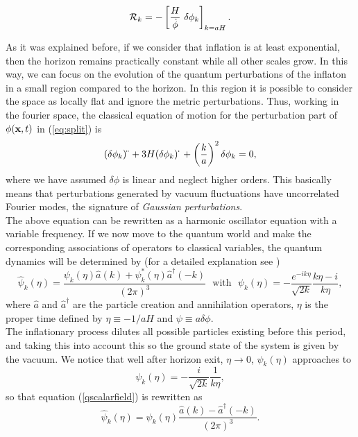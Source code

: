 \documentclass{rmaa}
\def\beq{\begin{equation}}
\def\eeq{\end{equation}}
\def\cal{\mathcal}
\begin{document}
\beq\label{eq:Pk1}
\mathcal{R}_k=-\left[ {H \over \dot \phi}\,\, \delta \phi_k \right]_{k=aH}.
\eeq
%

 
 \noindent
 As it was explained before, if we consider that inflation is at least exponential, 
 then the horizon remains practically constant while all other scales grow. In this way, 
 we can focus on the evolution of the quantum perturbations of the inflaton in a small 
 region compared to the horizon. In this region it is possible to consider the space as 
 locally flat and ignore the metric perturbations. Thus, working in the fourier space, the 
 classical equation of motion for the perturbation part of $\phi({\bf x},t)$ in (\ref{eq:split}) is
\beq
(\delta \phi_k)\ddot \,\,+3 H (\delta \phi_k)\dot \,\,+\left({k \over a}\right)^2 \delta \phi_k=0,
\eeq
%
where we have assumed $\delta \phi$ is linear and neglect higher orders. This basically means that perturbations generated by
vacuum fluctuations have uncorrelated Fourier modes, the signature of \textit{Gaussian perturbations}. 
\\

The above equation can be rewritten as a harmonic oscillator equation 
with a variable frequency. If we now move to the quantum world and make the corresponding 
associations of operators to classical variables, the quantum dynamics will be determined 
by (for a detailed explanation see \citep{LiddleLyth2})
\begin{equation}\label{qscalarfield}
\hat{\psi}_k\left(\eta\right)=\frac{\psi_k\left(\eta\right)\hat{a}\left(k\right)+\psi^*_k\left(\eta\right)\hat{a}^\dagger\left(-k\right)}{\left(2\pi\right)^3} \ \ \ \text{with} \ \ \ \psi_k\left(\eta\right)=-\frac{e^{-ik\eta}}{\sqrt{2k}}\frac{k\eta-i}{k\eta},
\end{equation}
where $\hat{a}$ and $\hat{a}^\dagger$ are the particle creation and annihilation 
operators, $\eta$ is the proper time defined by $\eta\equiv -1/aH$ and $\psi\equiv a\delta\phi$.
\\

The inflationary process dilutes all possible particles existing before this period, and
taking this into account this so the ground state of the system is given by the vacuum. 
We notice that well after horizon exit, $\eta \rightarrow 0$, $\psi_k\left(\eta\right)$ approaches to
\begin{equation}
\psi_k\left(\eta\right)=-\frac{i}{\sqrt{2k}}\frac{1}{k\eta},
\end{equation}
so that equation (\ref{qscalarfield}) is rewritten as
%
\begin{equation}
\hat{\psi}_k\left(\eta \right)=\psi_k\left(\eta\right)\frac{\hat{a}\left(k\right)-\hat{a}^\dagger\left(-k\right)}{\left(2\pi\right)^3}.
\end{equation}
\end{document}

